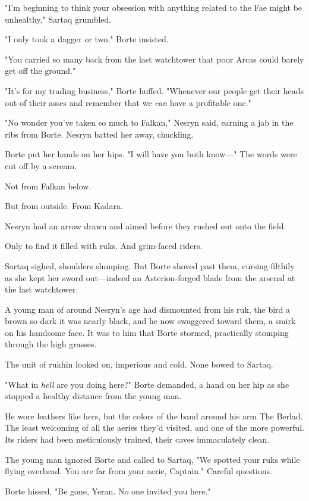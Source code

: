 "I'm beginning to think your obsession with anything related to the Fae might be unhealthy," Sartaq grumbled.

"I only took a dagger or two," Borte insisted.

"You carried so many back from the last watchtower that poor Arcas could barely get off the ground."

"It's for my trading business," Borte huffed. "Whenever our people get their heads out of their asses and remember that we \emph{can} have a profitable one."

"No wonder you've taken so much to Falkan," Nesryn said, earning a jab in the ribs from Borte. Nesryn batted her away, chuckling.

Borte put her hands on her hips. "I will have you both know---" The words were cut off by a scream.

Not from Falkan below.

But from outside. From Kadara.

Nesryn had an arrow drawn and aimed before they rushed out onto the field.

Only to find it filled with ruks. And grim-faced riders.

Sartaq sighed, shoulders slumping. But Borte shoved past them, cursing filthily as she kept her sword out---indeed an Asterion-forged blade from the arsenal at the last watchtower.

A young man of around Nesryn's age had dismounted from his ruk, the bird a brown so dark it was nearly black, and he now swaggered toward them, a smirk on his handsome face. It was to him that Borte stormed, practically stomping through the high grasses.

The unit of rukhin looked on, imperious and cold. None bowed to Sartaq.

"What in \emph{hell} are you doing here?" Borte demanded, a hand on her hip as she stopped a healthy distance from the young man.

He wore leathers like hers, but the colors of the band around his arm
 The Berlad. The least welcoming of all the aeries they'd visited, and one of the more powerful. Its riders had been meticulously trained, their caves immaculately clean.

The young man ignored Borte and called to Sartaq, "We spotted your ruks while flying overhead. You are far from your aerie, Captain." Careful questions.

Borte hissed, "Be gone, Yeran. No one invited you here."

